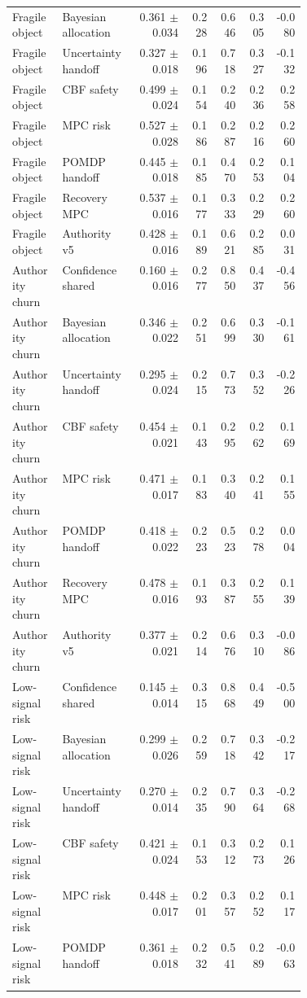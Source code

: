 \documentclass{article}
\begin{document}
\begin{center}
\begin{longtable}{p{0.17\linewidth}p{0.25\linewidth}rrrrr}
Fragile object & Bayesian allocation & 0.361 $\pm$ 0.034 & 0.228 & 0.646 & 0.305 & -0.080\\
Fragile object & Uncertainty handoff & 0.327 $\pm$ 0.018 & 0.196 & 0.718 & 0.327 & -0.132\\
Fragile object & CBF safety & 0.499 $\pm$ 0.024 & 0.154 & 0.240 & 0.236 & 0.258\\
Fragile object & MPC risk & 0.527 $\pm$ 0.028 & 0.186 & 0.287 & 0.216 & 0.260\\
Fragile object & POMDP handoff & 0.445 $\pm$ 0.018 & 0.185 & 0.470 & 0.253 & 0.104\\
Fragile object & Recovery MPC & 0.537 $\pm$ 0.016 & 0.177 & 0.333 & 0.229 & 0.260\\
Fragile object & Authority v5 & 0.428 $\pm$ 0.016 & 0.189 & 0.621 & 0.285 & 0.031\\
Authority churn & Confidence shared & 0.160 $\pm$ 0.016 & 0.277 & 0.850 & 0.437 & -0.456\\
Authority churn & Bayesian allocation & 0.346 $\pm$ 0.022 & 0.251 & 0.699 & 0.330 & -0.161\\
Authority churn & Uncertainty handoff & 0.295 $\pm$ 0.024 & 0.215 & 0.773 & 0.352 & -0.226\\
Authority churn & CBF safety & 0.454 $\pm$ 0.021 & 0.143 & 0.295 & 0.262 & 0.169\\
Authority churn & MPC risk & 0.471 $\pm$ 0.017 & 0.183 & 0.340 & 0.241 & 0.155\\
Authority churn & POMDP handoff & 0.418 $\pm$ 0.022 & 0.223 & 0.523 & 0.278 & 0.004\\
Authority churn & Recovery MPC & 0.478 $\pm$ 0.016 & 0.193 & 0.387 & 0.255 & 0.139\\
Authority churn & Authority v5 & 0.377 $\pm$ 0.021 & 0.214 & 0.676 & 0.310 & -0.086\\
Low-signal risk & Confidence shared & 0.145 $\pm$ 0.014 & 0.315 & 0.868 & 0.449 & -0.500\\
Low-signal risk & Bayesian allocation & 0.299 $\pm$ 0.026 & 0.259 & 0.718 & 0.342 & -0.217\\
Low-signal risk & Uncertainty handoff & 0.270 $\pm$ 0.014 & 0.235 & 0.790 & 0.364 & -0.268\\
Low-signal risk & CBF safety & 0.421 $\pm$ 0.024 & 0.153 & 0.312 & 0.273 & 0.126\\
Low-signal risk & MPC risk & 0.448 $\pm$ 0.017 & 0.201 & 0.357 & 0.252 & 0.117\\
Low-signal risk & POMDP handoff & 0.361 $\pm$ 0.018 & 0.232 & 0.541 & 0.289 & -0.063\\

\end{longtable}
\end{center}
\end{document}
